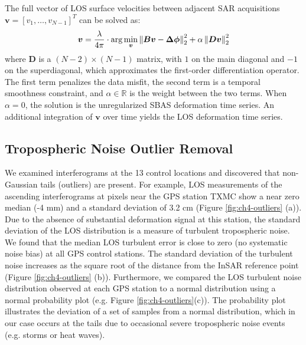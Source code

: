 The full vector of LOS surface velocities between adjacent SAR acquisitions $ \bm{v} = \left[v_1 , \ldots , v_{N-1} \right]^T $ can be solved as:
\begin{equation}
		\bm{v} = \frac{\lambda }{4 \pi} \cdot \arg \min_{\bm{v} } \left\lVert \bm{Bv} - \bm{\Delta \phi}   \right\rVert^2_2 + \alpha \left\lVert \bm{Dv} \right\rVert^2_2  \label{eq:ch4-sbas}
\end{equation}
where $ \bm{D} $ is a $ (N-2) \times (N-1) $ matrix, with $1$ on the main diagonal and $-1$ on the superdiagonal, which approximates the first-order differentiation operator. The first term penalizes the data misfit, the second term is a temporal smoothness constraint, and $ \alpha \in \mathbb{R} $ is the weight between the two terms. When $ \alpha = 0 $, the solution is the unregularized SBAS deformation time series. An additional integration of $\mathbf{v}$ over time yields the LOS deformation time series.



\subsection{Tropospheric Noise Outlier Removal}
\label{sec:ch4-outlier-method}

We examined interferograms at the 13 control locations and discovered that non-Gaussian tails (outliers) are present. For example, LOS measurements of the ascending interferograms at pixels near the GPS station TXMC show a near zero median (-4 mm) and a standard deviation of 3.2 cm (Figure \ref{fig:ch4-outliers} (a)). Due to the absence of substantial deformation signal at this station, the standard deviation of the LOS distribution is a measure of turbulent tropospheric noise.  We found that the median LOS turbulent error is close to zero (no systematic noise bias) at all GPS control stations. The standard deviation of the turbulent noise increases as the square root of the distance from the InSAR reference point (Figure \ref{fig:ch4-outliers} (b)). Furthermore, we compared the LOS turbulent noise distribution observed at each GPS station to a normal distribution using a normal probability plot \citep{Filliben1975ProbabilityPlotCorrelation} (e.g. Figure \ref{fig:ch4-outliers}(c)). The probability plot illustrates the deviation of a set of samples from a normal distribution, which in our case occurs at the tails due to occasional severe tropospheric noise events (e.g. storms or heat waves). 



